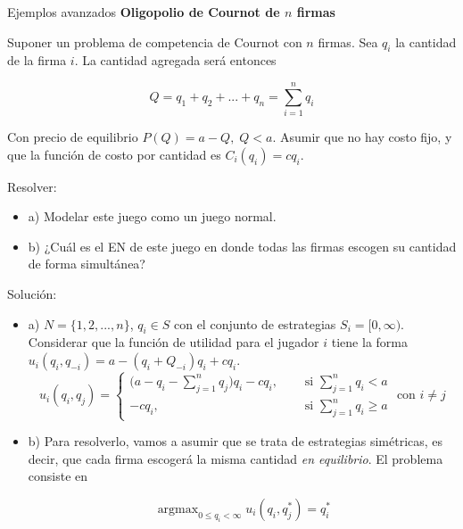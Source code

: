 \documentclass[12pt]{scrartcl}
\theoremstyle{definition}
\DeclareMathOperator*{\argmax}{argmax}
\newenvironment{myitemize}
{ \begin{itemize}
		\setlength{\itemsep}{0pt}
		\setlength{\parskip}{0pt}
		\setlength{\parsep}{0pt}     }
	{ \end{itemize}                  }
\begin{document}
\begin{exbox}{Ejemplos avanzados}
    \textbf{Oligopolio de Cournot de $n$ firmas}
    
    Suponer un problema de competencia de Cournot con $n$ firmas. Sea $q_i$ la cantidad de la firma $i$. La cantidad agregada será entonces
    
    \begin{equation}
        Q = q_1 + q_2 + ... + q_n = \sum_{i=1}^n q_i
    \end{equation}
    
    Con precio de equilibrio $P(Q)=a-Q,\;Q<a$. Asumir que no hay costo fijo, y que la función de costo por cantidad es $C_i(q_i)=cq_i$. 
    
    Resolver:
    
    \begin{myitemize}
        \item[a)] Modelar este juego como un juego normal.
        \item[b)] ¿Cuál es el EN de este juego en donde todas las firmas escogen su cantidad de forma simultánea?
    \end{myitemize}
    
    
    Solución:
    
    \begin{myitemize}
        \item[a)] $N=\{1, 2, ..., n\}$, $q_i \in S$ con el conjunto de estrategias $S_i=[0, \infty)$. Considerar que la función de utilidad para el jugador $i$ tiene la forma $u_i(q_i,q_{-i})=a-(q_i + Q_{-i})q_i+cq_i$.
    \begin{equation}
        u_i(q_i, q_j)=\begin{cases}
            \Big(a - q_i - \sum\limits_{j=1}^n q_j\Big)q_i -cq_i,\quad & \text{ si } \sum\limits_{j=1}^nq_i < a\\
            -cq_i, \quad & \text{ si } \sum\limits_{j=1}^nq_i \geq a
        \end{cases}
        \text{ con } i\neq j
    \end{equation}
    
        \item[b)] Para resolverlo, vamos a asumir que se trata de estrategias simétricas, es decir, que cada firma escogerá la misma cantidad \textit{en equilibrio}. El problema consiste en
        
        \[\argmax_{0 \leq q_i < \infty}u_i(q_i, q_j^*)=q_i^*\]
        

\end{myitemize}
\end{exbox}
\end{document}
